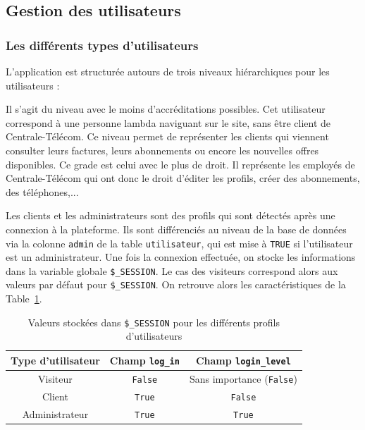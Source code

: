 \subsection{Gestion des utilisateurs}
\subsubsection{Les différents types d'utilisateurs}
L'application est structurée autours de trois niveaux hiérarchiques pour les utilisateurs :
\begin{itemize}
  Il s'agit du niveau avec le moins d'accréditations possibles. Cet utilisateur correspond à une personne lambda naviguant sur le site, sans être client de Centrale-Télécom.
  Ce niveau permet de représenter les clients qui viennent consulter leurs factures, leurs abonnements ou encore les nouvelles offres disponibles.
  Ce grade est celui avec le plus de droit. Il représente les employés de Centrale-Télécom qui ont donc le droit d'éditer les profils, créer des abonnements, des téléphones,...
\end{itemize}
Les clients et les administrateurs sont des profils qui sont détectés après une connexion à la plateforme. Ils sont différenciés au niveau de la base de données via la colonne \texttt{admin} de la table \texttt{utilisateur}, qui est mise à \texttt{TRUE} si l'utilisateur est un administrateur. Une fois la connexion effectuée, on stocke les informations dans la variable globale \texttt{\$\_SESSION}. Le cas des visiteurs correspond alors aux valeurs par défaut pour \texttt{\$\_SESSION}. On retrouve alors les caractéristiques de la Table~\ref{tab:utilisation_session}.

\begin{table}[ht]
  \centering
  \begin{tabular}{ccc}
    \toprule
    \textbf{Type d'utilisateur} & \textbf{Champ \texttt{log\_in}} & \textbf{Champ \texttt{login\_level}} \\
    \midrule
    Visiteur & \texttt{False} & Sans importance (\texttt{False}) \\
    Client   & \texttt{True} & \texttt{False} \\
    Administrateur & \texttt{True} & \texttt{True} \\
    \bottomrule
  \end{tabular}
  \caption{Valeurs stockées dans \texttt{\$\_SESSION} pour les différents profils d'utilisateurs}
  \label{tab:utilisation_session}
\end{table}

